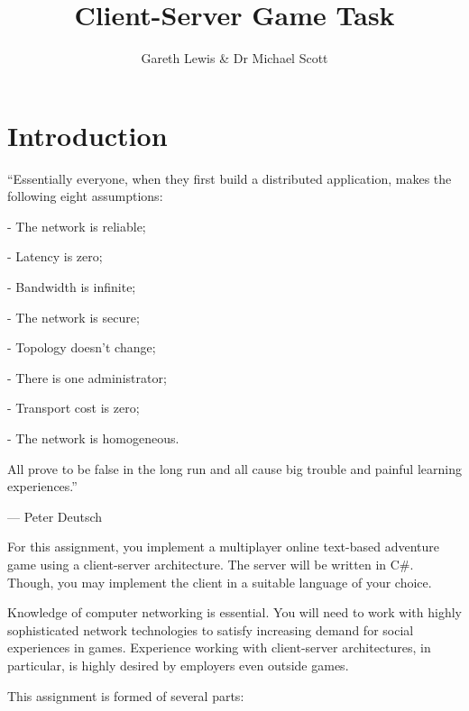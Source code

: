 \documentclass{../../fal_assignment}
\title{Client-Server Game Task}
\author{Gareth Lewis \& Dr Michael Scott}
\begin{document}
\maketitle

\section*{Introduction}

\begin{marginquote}
``Essentially everyone, when they first build a distributed application, makes the following eight assumptions:

\par - The network is reliable;
\par - Latency is zero;
\par - Bandwidth is infinite;
\par - The network is secure;
\par - Topology doesn't change;
\par - There is one administrator;
\par - Transport cost is zero;
\par - The network is homogeneous.

All prove to be false in the long run and all cause big trouble and painful learning experiences.''

\par --- Peter Deutsch
\end{marginquote}

For this assignment, you implement a multiplayer online text-based adventure game using a client-server architecture.  The server will be written in C\#. Though, you may implement the client in a suitable language of your choice. 

Knowledge of computer networking is essential. You will need to work with highly sophisticated network technologies to satisfy increasing demand for social experiences in games. Experience working with client-server architectures, in particular, is highly desired by employers even outside games.

This assignment is formed of several parts:
\end{document}
